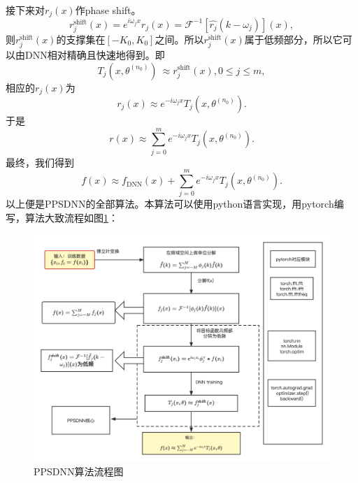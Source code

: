 接下来对$r_j(x)$作phase shift。
\begin{equation}
r_{j}^{\text{shift}}(x)=e^{i\omega_jx}r_j(x)=\mathcal{F}^{-1}\left[  \widehat{r_{j}}(k-\omega
_{j})\right]  (x),\label{rjshift}%
\end{equation}
则$r_{j}^{\text{shift}}(x)$的支撑集在$[-K_0,K_0]$之间。所以$r_{j}^{\text{shift}}(x)$属于低频部分，所以它可以由DNN相对精确且快速地得到。即
\begin{equation}
T_{j}(x,\theta^{(n_{0})})\ \approx r_{j}^{\text{shift}}(x),0\leq j\leq m,
\end{equation}
相应的$r_j(x)$为
\begin{equation}
r_{j}(x)\approx e^{-i\omega_{j}x}T_{j}(x,\theta^{(n_{0})}).
\end{equation}
于是
\begin{equation}
r(x)\approx%
{\displaystyle\sum\limits_{j=0}^{m}}
e^{-i\omega_{j}x}T_{j}(x,\theta^{(n_{0})}).
\end{equation}
最终，我们得到
\begin{equation}
f(x) \approx f_{\text{DNN}}(x)+%
{\displaystyle\sum\limits_{j=0}^{m}}
e^{-i\omega_{j}x}T_{j}(x,\theta^{(n_{0})}). \label{DNNupdate}%
\end{equation}
以上便是PPSDNN的全部算法。本算法可以使用python语言实现，用pytorch\cite{ketkar2021introduction}编写，算法大致流程如图\ref{ppsdnnchart}：
\begin{figure}[htbp]
    \centering
    \includegraphics[width=0.95\linewidth]{figures/ppsdnnchart.pdf}
    \caption{PPSDNN算法流程图}
    \label{ppsdnnchart}
\end{figure}



